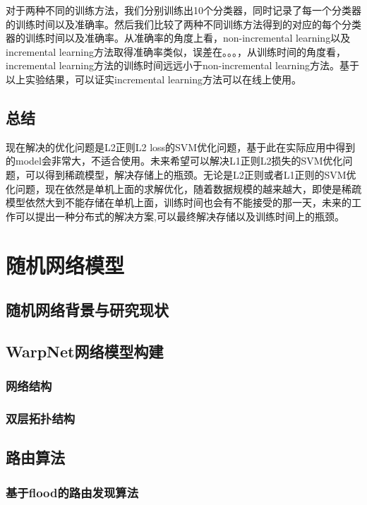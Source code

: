 \documentclass[master]{njuthesis}
\begin{document}
\begin{enumerate}
\begin{enumerate}
\begin{enumerate}
\begin{enumerate}
    对于两种不同的训练方法，我们分别训练出10个分类器，同时记录了每一个分类器的训练时间以及准确率。然后我们比较了两种不同训练方法得到的对应的每个分类器的训练时间以及准确率。从准确率的角度上看，non-incremental learning以及incremental learning方法取得准确率类似，误差在。。。，从训练时间的角度看，incremental learning方法的训练时间远远小于non-incremental learning方法。基于以上实验结果，可以证实incremental learning方法可以在线上使用。

\section{总结}

    现在解决的优化问题是L2正则L2 loss的SVM优化问题，基于此在实际应用中得到的model会非常大，不适合使用。未来希望可以解决L1正则L2损失的SVM优化问题，可以得到稀疏模型，解决存储上的瓶颈。无论是L2正则或者L1正则的SVM优化问题，现在依然是单机上面的求解优化，随着数据规模的越来越大，即使是稀疏模型依然大到不能存储在单机上面，训练时间也会有不能接受的那一天，未来的工作可以提出一种分布式的解决方案,可以最终解决存储以及训练时间上的瓶颈。
\chapter{随机网络模型}\label{chapter_random}
\section{随机网络背景与研究现状}
\Blindtext
\section{WarpNet网络模型构建}\label{sec:warpnet_construction}
\subsection{网络结构}
\Blindtext
\subsection{双层拓扑结构}
\Blindtext
\section{路由算法}
\subsection{基于flood的路由发现算法}
\Blindtext

\end{enumerate}
\end{enumerate}
\end{enumerate}
\end{enumerate}
\end{document}
